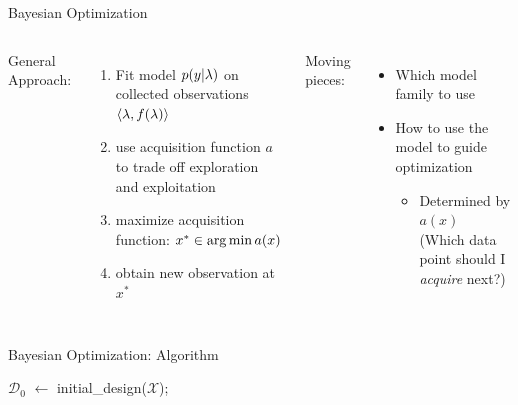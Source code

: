 \begin{frame}[c,fragile]{Bayesian Optimization }
\begin{columns}
General Approach:
\begin{enumerate}
  \item Fit model $p(y | \mathbf{\lambda})$ on collected observations $\langle{}\mathbf{\lambda}, f(\mathbf{\lambda})\rangle{}$
  \pause
  \item use acquisition function $a$ to trade off exploration and exploitation
  \pause
  \item maximize acquisition function: $x^* \in \operatorname*{arg\,min} a(x)$
  \pause
  \item obtain new observation at $x^*$
\end{enumerate}

\pause
Moving pieces:
\begin{itemize}
  	\item Which \alert{model family} to use 
	\item How to use the model to guide optimization
	\begin{itemize}
		\item Determined by $a(x)$\\
		(Which data point should I \emph{acquire} next?) 
	\end{itemize}
\end{itemize}

\end{columns}

\end{frame}
\begin{frame}[c,fragile]{Bayesian Optimization: Algorithm}

\begin{algorithm}[H]
	\BlankLine
	$\mathcal{D}_0$ $\leftarrow$ initial\_design($\mathcal{X}$); \\
	\For{n = $1, 2, \ldots m - |D_0|$}{
		$\surro: \conf \mapsto f(\lambda)$ $\leftarrow$ fit predictive model on $\mathcal{D}_{n-1}$;\\
		select $x_{n}$ by optimizing $x_{n} \in \argmax_{x \in \mathcal{X}} \alpha(x; \mathcal{D}_{n-1}, \surro)$;\\
		Query $y_{n} := f(x_{n})$;\\
		Add observation to data $D_{n} := D_{n-1} \cup \{\langle x_{n}, y_{n} \rangle \}$;\\
	}
	\caption{Bayesian Optimization (BO)}
\end{algorithm}


\end{frame}
